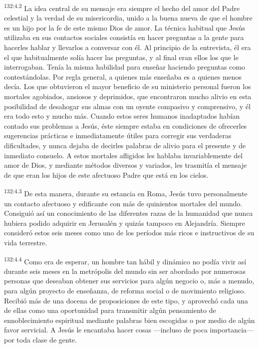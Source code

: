 \par
\textsuperscript{132:4.2} La idea central de su mensaje era siempre el hecho del amor del Padre celestial y la verdad de su misericordia, unido a la buena nueva de que el hombre es un hijo por la fe de este mismo Dios de amor. La técnica habitual que Jesús utilizaba en sus contactos sociales consistía en hacer preguntas a la gente para hacerles hablar y llevarlos a conversar con él. Al principio de la entrevista, él era el que habitualmente solía hacer las preguntas, y al final eran ellos los que le interrogaban. Tenía la misma habilidad para enseñar haciendo preguntas como contestándolas. Por regla general, a quienes más enseñaba es a quienes menos decía. Los que obtuvieron el mayor beneficio de su ministerio personal fueron los mortales agobiados, ansiosos y deprimidos, que encontraron mucho alivio en esta posibilidad de desahogar sus almas con un oyente compasivo y comprensivo, y él era todo esto y mucho más. Cuando estos seres humanos inadaptados habían contado sus problemas a Jesús, éste siempre estaba en condiciones de ofrecerles sugerencias prácticas e inmediatamente útiles para corregir sus verdaderas dificultades, y nunca dejaba de decirles palabras de alivio para el presente y de inmediato consuelo. A estos mortales afligidos les hablaba invariablemente del amor de Dios, y mediante métodos diversos y variados, les trasmitía el mensaje de que eran los hijos de este afectuoso Padre que está en los cielos.

\par
\textsuperscript{132:4.3} De esta manera, durante su estancia en Roma, Jesús tuvo personalmente un contacto afectuoso y edificante con más de quinientos mortales del mundo. Consiguió así un conocimiento de las diferentes razas de la humanidad que nunca hubiera podido adquirir en Jerusalén y quizás tampoco en Alejandría. Siempre consideró estos seis meses como uno de los períodos más ricos e instructivos de su vida terrestre.

\par
\textsuperscript{132:4.4} Como era de esperar, un hombre tan hábil y dinámico no podía vivir así durante seis meses en la metrópolis del mundo sin ser abordado por numerosas personas que deseaban obtener sus servicios para algún negocio o, más a menudo, para algún proyecto de enseñanza, de reforma social o de movimiento religioso. Recibió más de una docena de proposiciones de este tipo, y aprovechó cada una de ellas como una oportunidad para transmitir algún pensamiento de ennoblecimiento espiritual mediante palabras bien escogidas o por medio de algún favor servicial. A Jesús le encantaba hacer cosas ---incluso de poca importancia--- por toda clase de gente.

